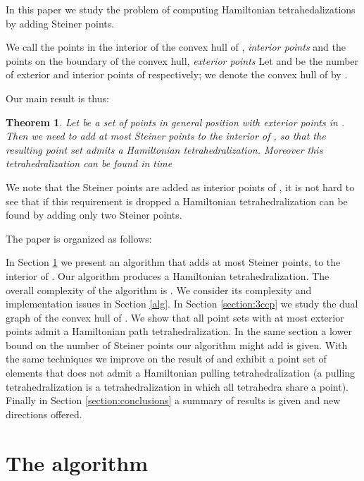 \documentclass{article}
\newtheorem{theorem}{Theorem}
\begin{document}
In this paper we study the problem of computing
Hamiltonian tetrahedalizations by adding Steiner 
points.\par

We call the points in the interior of the convex hull of 
, \emph{interior points} and the points on the
boundary of the convex hull, \emph{exterior points}
Let  and  be the number of exterior and
interior points of  respectively; 
we denote the convex hull of  by .\par

Our main result is thus:

\begin{theorem}\label{teo:main}
Let  be a set of  points in general position with  exterior points in . Then we need to add at most  Steiner points to the interior
of  , so that the resulting point
set admits a Hamiltonian tetrahedralization. Moreover this tetrahedralization can
be found in time 
\end{theorem}

We note that the Steiner points are added as interior points of , it is not
hard to see that if this requirement is dropped a Hamiltonian tetrahedralization
can be found by adding only two Steiner points.\par

The paper is organized as follows:\par

In Section \ref{join} we present an algorithm that adds at most 
Steiner points,  to the interior of .
Our algorithm produces a Hamiltonian
tetrahedralization.
The overall complexity
of the algorithm is . We consider its complexity
and implementation issues in Section \ref{alg}.
In Section \ref{section:3ccp} we study the dual graph of the convex hull
of . We show that all point sets with at most  exterior points 
admit a Hamiltonian path tetrahedralization. In the same section a lower bound 
on the number of Steiner points our algorithm might add is given. With the same techniques
we improve on the result of  \cite{isora} and exhibit a point set of  elements
that does not admit a Hamiltonian pulling tetrahedralization (a pulling tetrahedralization
is a tetrahedralization in which all tetrahedra share a point).
Finally in Section \ref{section:conclusions} a summary of results is given and new directions offered.
\par

\section{The algorithm}\label{join}
\end{document}
